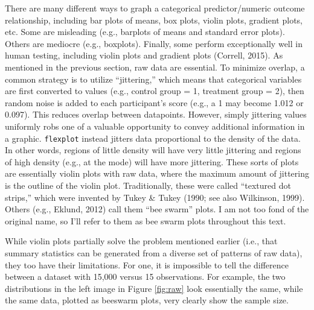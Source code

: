 \documentclass[
  man]{apa6}
\begin{document}
There are many different ways to graph a categorical predictor/numeric outcome relationship, including bar plots of means, box plots, violin plots, gradient plots, etc. Some are misleading (e.g., barplots of means and standard error plots). Others are mediocre (e.g., boxplots). Finally, some perform exceptionally well in human testing, including violin plots and gradient plots (Correll, 2015). As mentioned in the previous section, raw data are essential. To minimize overlap, a common strategy is to utilize ``jittering,'' which means that categorical variables are first converted to values (e.g., control group = 1, treatment group = 2), then random noise is added to each participant's score (e.g., a 1 may become 1.012 or 0.097). This reduces overlap between datapoints. However, simply jittering values uniformly robs one of a valuable opportunity to convey additional information in a graphic. \texttt{flexplot} instead jitters data proportional to the density of the data. In other words, regions of little density will have very little jittering and regions of high density (e.g., at the mode) will have more jittering. These sorts of plots are essentially violin plots with raw data, where the maximum amount of jittering is the outline of the violin plot. Traditionally, these were called ``textured dot strips,'' which were invented by Tukey \& Tukey (1990; see also Wilkinson, 1999). Others (e.g., Eklund, 2012) call them ``bee swarm'' plots. I am not too fond of the original name, so I'll refer to them as bee swarm plots throughout this text.

While violin plots partially solve the problem mentioned earlier (i.e., that summary statistics can be generated from a diverse set of patterns of raw data), they too have their limitations. For one, it is impossible to tell the difference between a dataset with 15,000 versus 15 observations. For example, the two distributions in the left image in Figure \ref{fig:raw} look essentially the same, while the same data, plotted as beeswarm plots, very clearly show the sample size.

\small
\end{document}
